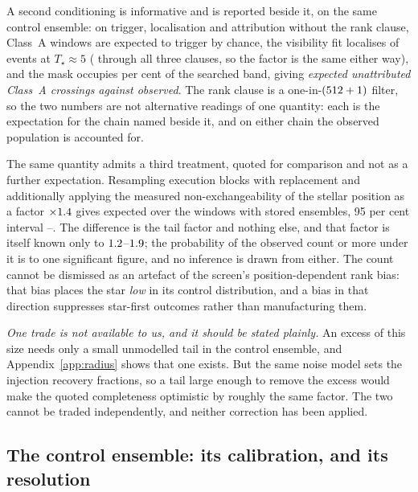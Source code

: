 A second conditioning is informative and is reported beside it, on the same
control ensemble: on trigger, localisation and attribution without the rank
clause, \RsevChanceTrigA{} Class~A windows are expected to trigger by chance,
the visibility fit localises \RsevChanceFracLoc{} of events at
$T_\star\approx5$ (\RsevChanceFracLocThree{} through all three clauses, so
the factor is the same either way), and the mask occupies
\RsevChanceOccPct{} per cent of the searched band, giving
\emph{\RsevChanceExp{} expected unattributed Class~A crossings against
\RsevChanceObsAUnattr{} observed}. The rank clause is a one-in-$(512+1)$
filter, so the two numbers are not alternative readings of one quantity: each
is the expectation for the chain named beside it, and on either chain the
observed population is accounted for.

The same quantity admits a third treatment, quoted for comparison and not as
a further expectation. Resampling execution blocks with replacement and
additionally applying the measured non-exchangeability of the stellar
position as a factor $\times1.4$ gives \PriMean{} expected over the
\PriNWin{} windows with stored ensembles, 95 per cent interval
\PriQLo--\PriQHi. The difference is the tail factor and nothing else, and
that factor is itself known only to $1.2$--$1.9$; the
probability of the observed count or more under it is \RobP{} to one
significant figure, and no inference is drawn from either. The count cannot
be dismissed as an artefact of the screen's position-dependent rank bias:
that bias places the star \emph{low} in its control distribution, and a bias
in that direction suppresses star-first outcomes rather than manufacturing
them.

\emph{One trade is not available to us, and it should be stated plainly.} An
excess of this size needs only a small unmodelled tail in the control
ensemble, and Appendix~\ref{app:radius} shows that one exists. But the same
noise model sets the injection recovery fractions, so a tail large enough to
remove the excess would make the quoted completeness optimistic by roughly
the same factor. The two cannot be traded independently, and neither
correction has been applied.

\subsection{The control ensemble: its calibration, and its resolution}


